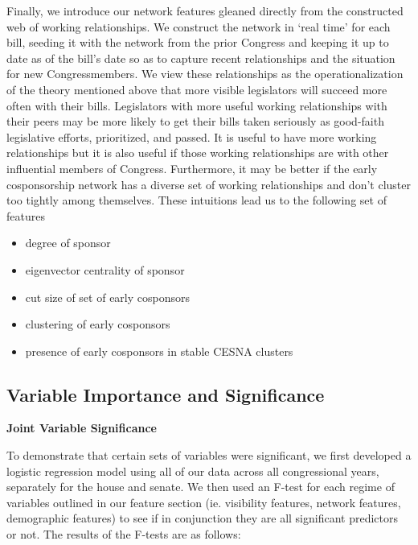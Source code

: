 Finally, we introduce our network features gleaned directly from the constructed
web of working relationships. We construct the network in `real time' for each
bill, seeding it with the network from the prior Congress and keeping it up to
date as of the bill's date so as to capture recent relationships and the
situation for new Congressmembers. We view these relationships as the
operationalization of the theory mentioned above that more visible legislators
will succeed more often with their bills. Legislators with more useful working
relationships with their peers may be more likely to get their bills taken
seriously as good-faith legislative efforts, prioritized, and passed. It is
useful to have more working relationships but it is also useful if those working
relationships are with other influential members of Congress. Furthermore, it
may be better if the early cosponsorship network has a diverse set of working
relationships and don't cluster too tightly among themselves. These intuitions
lead us to the following set of features
\begin{itemize}
	\item degree of sponsor
	\item eigenvector centrality of sponsor
	\item cut size of set of early cosponsors
	\item clustering of early cosponsors
	\item presence of early cosponsors in stable CESNA clusters
\end{itemize}

\subsection{Variable Importance and Significance}

\textbf{Joint Variable Significance}

To demonstrate that certain sets of variables were significant, we first
developed a logistic regression model using all of our data across all
congressional years, separately for the house and senate. We then used an F-test
for each regime of variables outlined in our feature section (ie. visibility
features, network features, demographic features) to see if in conjunction they
are all significant predictors or not. The results of the F-tests are as follows:


